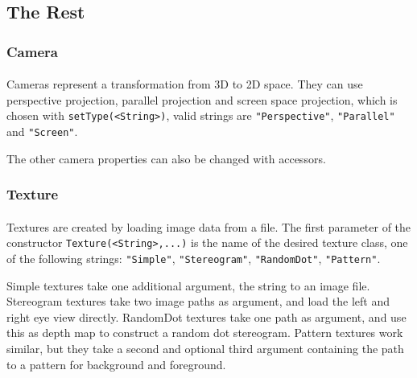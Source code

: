 \subsection{The Rest}
\subsubsection{Camera}
\paragraph{}
Cameras represent a transformation from 3D to 2D space.
They can use perspective projection, parallel projection and screen space projection, which is chosen with \texttt{setType(<String>)}, valid strings are \texttt{"Perspective"}, \texttt{"Parallel"} and \texttt{"Screen"}.

The other camera properties can also be changed with accessors.

\subsubsection{Texture}
\paragraph{}
Textures are created by loading image data from a file.
The first parameter of the constructor \texttt{Texture(<String>,...)} is the name of the desired texture class, one of the following strings: \texttt{"Simple"}, \texttt{"Stereogram"}, \texttt{"RandomDot"}, \texttt{"Pattern"}.

Simple textures take one additional argument, the string to an image file.
Stereogram textures take two image paths as argument, and load the left and right eye view directly.
RandomDot textures take one path as argument, and use this as depth map to construct a random dot stereogram.
Pattern textures work similar, but they take a second and optional third argument containing the path to a pattern for background and foreground.

